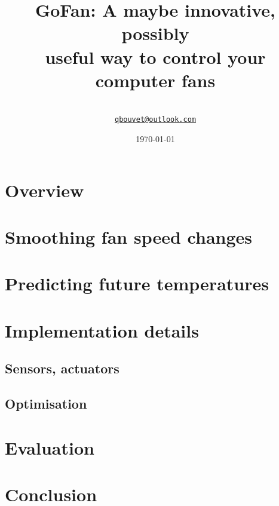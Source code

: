 \documentclass[11pt]{article}
\title{
    GoFan: A maybe innovative, possibly \\
    useful way to control your computer fans
}
\author{\\%
    \href{mailto:qbouvet@outlook.com}{\texttt{qbouvet@outlook.com}} %
}
\date{\today}
\begin{document}
\maketitle



\tableofcontents

\newpage


%
%

\section{Overview}

\section{Smoothing fan speed changes}

\section{Predicting future temperatures}

\section{Implementation details}
\subsection{Sensors, actuators}
\subsection{Optimisation}

\section{Evaluation}


\section{Conclusion}



%
%

\medskip

 

\newpage

\end{document}
